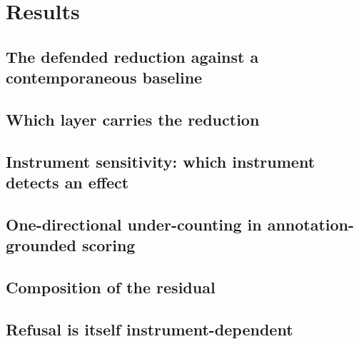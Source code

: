 \section{Results}
\label{sec:results}

\subsection{The defended reduction against a contemporaneous baseline}
\label{sec:results-headline}

\subsection{Which layer carries the reduction}
\label{sec:results-layers}

\subsection{Instrument sensitivity: which instrument detects an effect}
\label{sec:results-instrument}

\subsection{One-directional under-counting in annotation-grounded scoring}
\label{sec:results-undercount}

\subsection{Composition of the residual}
\label{sec:results-residual}

\subsection{Refusal is itself instrument-dependent}
\label{sec:results-refusal}
